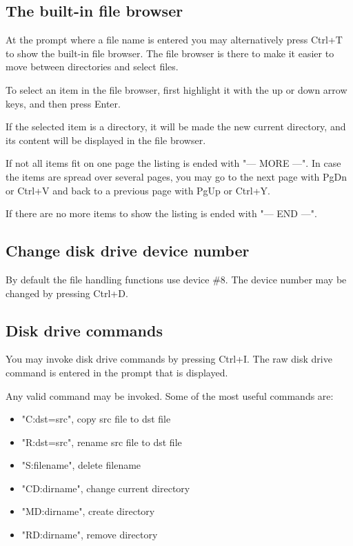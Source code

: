 \documentclass{article}
\begin{document}
    \subsection{The built-in file browser}
        At the prompt where a file name is entered you may alternatively press Ctrl+T to show the
        built-in file browser. The file browser is there to make it easier to move between directories 
        and select files.
        
        To select an item in the file browser, first highlight it with the up or down arrow keys, and then press Enter.

        If the selected item is a directory, it will be made the new current directory, and its content will
        be displayed in the file browser.

        If not all items fit on one page the listing is ended with "--- MORE ---". 
        In case the items are spread over several pages, you may go to 
        the next page with PgDn or Ctrl+V and back to a previous page with PgUp or Ctrl+Y.

        If there are no more items to show the listing is ended with "--- END ---".

    \subsection{Change disk drive device number}
        By default the file handling functions use device \#8. The device
        number may be changed by pressing Ctrl+D.

    \subsection{Disk drive commands}
        You may invoke disk drive commands by pressing Ctrl+I. The raw disk drive command
        is entered in the prompt that is displayed.

        Any valid command may be invoked. Some of the most useful commands are:

     \begin{itemize} 
            \item "C:dst=src", copy src file to dst file
            \item "R:dst=src", rename src file to dst file
            \item "S:filename", delete filename
            \item "CD:dirname", change current directory
            \item "MD:dirname", create directory
            \item "RD:dirname", remove directory
    \end{itemize}
    
\end{document}
